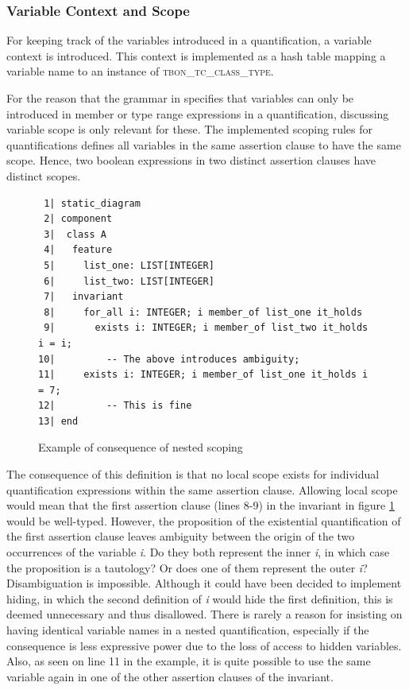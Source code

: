 \subsubsection{Variable Context and Scope}
For keeping track of the variables introduced in a quantification, a variable context is introduced. This context is implemented as a hash table mapping a variable name to an instance of \textsc{tbon\_tc\_class\_type}.

For the reason that the grammar in \cite{walden1995} specifies that variables can only be introduced in member  or type range expressions in a quantification, discussing variable scope is only relevant for these. The implemented scoping rules for quantifications defines all variables in the same assertion clause to have the same scope. Hence, two boolean expressions in two distinct assertion clauses have distinct scopes.
\begin{figure}[H]
{\footnotesize
\begin{verbatim}
 1| static_diagram
 2| component
 3|  class A
 4|   feature
 5|     list_one: LIST[INTEGER]
 6|     list_two: LIST[INTEGER]
 7|   invariant
 8|     for_all i: INTEGER; i member_of list_one it_holds 
 9|       exists i: INTEGER; i member_of list_two it_holds i = i; 
10|         -- The above introduces ambiguity;
11|     exists i: INTEGER; i member_of list_one it_holds i = 7; 
12|         -- This is fine
13| end
\end{verbatim}
}
\caption{Example of consequence of nested scoping}
\label{fig:variable_scoping}
\end{figure}
The consequence of this definition is that no local scope exists for individual quantification expressions within the same assertion clause. Allowing local scope would mean that the first assertion clause (lines 8-9) in the invariant in figure \ref{fig:variable_scoping} would be well-typed. However, the proposition of the existential quantification of the first assertion clause leaves ambiguity between the origin of the two occurrences of the variable \textit{i}. Do they both represent the inner \textit{i}, in which case the proposition is a tautology? Or does one of them represent the outer \textit{i}? Disambiguation is impossible. Although it could have been decided to implement hiding, in which the second definition of \textit{i} would hide the first definition, this is deemed unnecessary and thus disallowed. There is rarely a reason for insisting on having identical variable names in a nested quantification, especially if the consequence is less expressive power due to the loss of access to hidden variables. Also, as seen on line 11 in the example, it is quite possible to use the same variable again in one of the other assertion clauses of the invariant.
